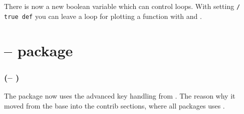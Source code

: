 \documentclass[11pt,english,BCOR10mm,DIV12,bibliography=totoc,parskip=false,smallheadings
    headexclude,footexclude,oneside]{pst-doc}
\let\psttreeFV\fileversion
\let\psttreeFD\filedate
\begin{document}
There is now a new \PS boolean variable which can control loops.
With setting \texttt{/ true def} you can leave a loop
for plotting a function with  and .


\part{ -- package}
\section{ (\psttreeFV -- \psttreeFD)}

The package  now uses the advanced key handling from . The reason
why it moved from the base into the contrib sections, where all packages uses .

\nocite{*}



\printindex
\end{document}

